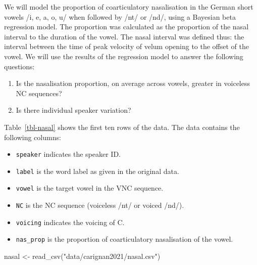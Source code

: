 \documentclass[
  authoryear,
  preprint,
  3p]{elsarticle}
\newenvironment{Shaded}{\begin{snugshade}}{\end{snugshade}}
\newcommand{\FunctionTok}[1]{\textcolor[rgb]{0.28,0.35,0.67}{#1}}
\newcommand{\NormalTok}[1]{\textcolor[rgb]{0.00,0.23,0.31}{#1}}
\newcommand{\OtherTok}[1]{\textcolor[rgb]{0.00,0.23,0.31}{#1}}
\newcommand{\StringTok}[1]{\textcolor[rgb]{0.13,0.47,0.30}{#1}}
\providecommand{\tightlist}{%
  \setlength{\itemsep}{0pt}\setlength{\parskip}{0pt}}\usepackage{longtable,booktabs,array}
\begin{document}
We will model the proportion of coarticulatory nasalisation in the
German short vowels /i, e, a, o, u/ when followed by /nt/ or /nd/, using
a Bayesian beta regression model. The proportion was calculated as the
proportion of the nasal interval to the duration of the vowel. The nasal
interval was defined thus: the interval between the time of peak
velocity of velum opening to the offset of the vowel. We will use the
results of the regression model to answer the following questions:

\begin{enumerate}
\def\labelenumi{\arabic{enumi}.}
\tightlist
\item
  Is the nasalisation proportion, on average across vowels, greater in
  voiceless NC sequences?
\item
  Is there individual speaker variation?
\end{enumerate}

Table~\ref{tbl-nasal} shows the first ten rows of the data. The data
contains the following columns:

\begin{itemize}
\item
  \texttt{speaker} indicates the speaker ID.
\item
  \texttt{label} is the word label as given in the original data.
\item
  \texttt{vowel} is the target vowel in the VNC sequence.
\item
  \texttt{NC} is the NC sequence (voiceless /nt/ or voiced /nd/).
\item
  \texttt{voicing} indicates the voicing of C.
\item
  \texttt{nas\_prop} is the proportion of coarticulatory nasalisation of
  the vowel.
\end{itemize}

\begin{Shaded}
\begin{Highlighting}[]
\NormalTok{nasal }\OtherTok{\textless{}{-}} \FunctionTok{read\_csv}\NormalTok{(}\StringTok{"data/carignan2021/nasal.csv"}\NormalTok{)}
\end{Highlighting}
\end{Shaded}
\end{document}
